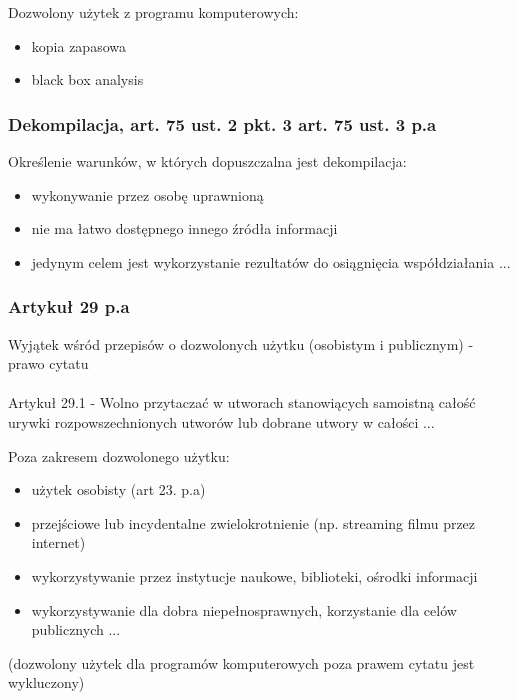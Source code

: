 \documentclass[12pt,a4paper]{article}
\begin{document}
Dozwolony użytek z programu komputerowych:
\begin{itemize}
\item kopia zapasowa
\item black box analysis
\end{itemize}

\subsubsection{Dekompilacja, art. 75 ust. 2 pkt. 3  art. 75 ust. 3 p.a}
Określenie warunków, w których dopuszczalna jest dekompilacja:
\begin{itemize}
\item wykonywanie przez osobę uprawnioną
\item nie ma łatwo dostępnego innego źródła informacji
\item jedynym celem jest wykorzystanie rezultatów do osiągnięcia współdziałania ...
\end{itemize}
\subsubsection{Artykuł 29 p.a}
Wyjątek wśród przepisów o dozwolonych użytku (osobistym i publicznym) - prawo cytatu

\paragraph{}
Artykuł 29.1 - Wolno przytaczać w utworach stanowiących samoistną całość urywki rozpowszechnionych utworów lub dobrane utwory w całości ...

Poza zakresem dozwolonego użytku:
\begin{itemize}
\item użytek osobisty (art 23. p.a)
\item przejściowe lub incydentalne zwielokrotnienie (np. streaming filmu przez internet)
\item wykorzystywanie przez instytucje naukowe, biblioteki, ośrodki informacji
\item wykorzystywanie dla dobra niepełnosprawnych, korzystanie dla celów publicznych ...
\end{itemize}

(dozwolony użytek dla programów komputerowych poza prawem cytatu jest wykluczony)
\end{document}
